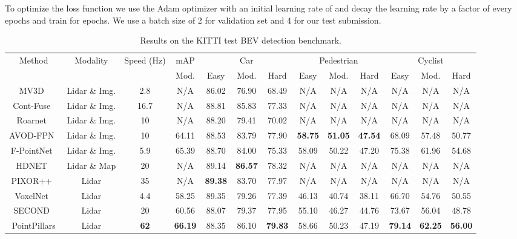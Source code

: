 \documentclass[10pt,twocolumn,letterpaper]{article}
\begin{document}
To optimize the loss function we use the Adam optimizer with an initial learning rate of  and decay the learning rate by a factor of  every  epochs and train for  epochs.
We use a batch size of 2 for validation set and 4 for our test submission. 
\begin{table*}[]
\small
\begin{tabular}{| c | c | c | c || c | c | c || c | c | c || c | c | c |}
\hline
\multirow{2}{*}{Method}				& \multirow{2}{*}{Modality}			& \multirow{2}{10mm}{Speed (Hz)}	& mAP		& \multicolumn{3}{|c||}{Car}		& \multicolumn{3}{|c||}{Pedestrian}		& \multicolumn{3}{|c|}{Cyclist}	\\ \cline{4-13}
					&				& 		& Mod.		& Easy		& Mod.		& Hard		& Easy		& Mod.		& Hard		& Easy		& Mod.		& Hard	\\ \hline 
MV3D~\cite{mv3d}		& Lidar \& Img.	& 2.8		& N/A		& 86.02 		& 76.90 		& 68.49		&  N/A		&  N/A 		&  N/A		&  N/A 		&  N/A 		&  N/A	\\ 
Cont-Fuse~\cite{contfuse}		& Lidar \& Img.	& 16.7			& N/A		& 88.81 		& 85.83 		& 77.33		&  N/A		&  N/A 		&  N/A		&  N/A 		&  N/A 		&  N/A	\\ 
Roarnet~\cite{roarnet}		& Lidar \& Img.	& 10		& N/A		& 88.20 		& 79.41 		& 70.02		&  N/A		&  N/A 		&  N/A		&  N/A 		&  N/A 		&  N/A	\\ 
AVOD-FPN~\cite{avod}	& Lidar \& Img.	& 10		& 64.11		& 88.53		& 83.79 		& 77.90		& \textbf{58.75}	& \textbf{51.05}	& \textbf{47.54}	& 68.09 		& 57.48		& 50.77	\\ 
F-PointNet~\cite{frustum}	&  Lidar \& Img.	& 5.9		& 65.39		& 88.70		& 84.00 		& 75.33		& 58.09		& 50.22		& 47.20		& 75.38		& 61.96		& 54.68	\\ \hline
HDNET~\cite{hdnet}	&  Lidar \& Map	& 20		& N/A		& 89.14		& \textbf{86.57}		& 78.32		& N/A		& N/A		& N/A		& N/A		& N/A		& N/A	\\ \hline
PIXOR++~\cite{hdnet}	& Lidar			& 35			& N/A		& \textbf{89.38} & 83.70 		& 77.97		&  N/A		&  N/A 		&  N/A		&  N/A 		&  N/A 		&  N/A	\\ 
VoxelNet~\cite{voxelnet}	& Lidar			& 4.4		& 58.25		& 89.35	& 79.26 		& 77.39		& 46.13		& 40.74		& 38.11		& 66.70		& 54.76		& 50.55	\\
SECOND~\cite{second}	& Lidar			& 20			& 60.56		& 88.07 		& 79.37 		& 77.95		& 55.10 		& 46.27		& 44.76		& 73.67		& 56.04		& 48.78	\\ \hline
PointPillars			& Lidar			& \textbf{62}	& \textbf{66.19}	& 88.35		& 86.10	& \textbf{79.83}	& 58.66		& 50.23		& 47.19		& \textbf{79.14} & \textbf{62.25} & \textbf{56.00} \\ \hline
\end{tabular}
\caption{Results on the KITTI test BEV detection benchmark.}
\label{table:res_bev}
\end{table*}
\end{document}
